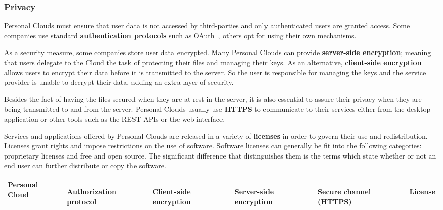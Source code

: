 {\subsubsection{Privacy}


Personal Clouds must ensure that user data is not accessed by third-parties and only authenticated users are granted access. Some companies use standard \textbf{authentication protocols} such as OAuth~\cite{oauth}, others opt for using their own mechanisms.

As a security measure, some companies store user data encrypted. Many Personal Clouds can provide \textbf{server-side encryption}; meaning that users delegate to the Cloud the task of protecting their files and managing their keys. As an alternative, \textbf{client-side encryption} allows users to encrypt their data before it is transmitted to the server. So the user is responsible for managing the keys and the service provider is unable to decrypt their data, adding an extra layer of security.

Besides the fact of having the files secured when they are at rest in the server, it is also essential to assure their privacy when they are being transmitted to and from the server. Personal Clouds usually use \textbf{HTTPS} to communicate to their services either from the desktop application or other tools such as the REST APIs or the web interface.

Services and applications offered by Personal Clouds are released in a variety of \textbf{licenses} in order to govern their use and redistribution. Licenses grant rights and impose restrictions on the use of software. Software licenses can generally be fit into the following categories: proprietary licenses and free and open source. The significant difference that distinguishes them is the terms which state whether or not an end user can further distribute or copy the software.


{
\def\arraystretch{1.5}

\begin{table}
\begin{center}
    \begin{tabular}{ | p{3.3cm} | p{2.5cm} | p{1.2cm} | p{1.9cm} | p{1.2cm} | p{3.8cm} | }
    \hline
    \rowcolor[gray]{0.8}

	\textbf{Personal Cloud} &
	\begin{sideways}\textbf{Authorization protocol}\end{sideways} &
	\begin{sideways}\textbf{Client-side encryption}\end{sideways} &
	\begin{sideways}\textbf{Server-side encryption}\end{sideways} & 
	\begin{sideways}\textbf{Secure channel (HTTPS)}\end{sideways} &
	\begin{sideways}\textbf{License}\end{sideways} \\ \hline
	

\end{tabular}
\end{center}
\end{table}}}

